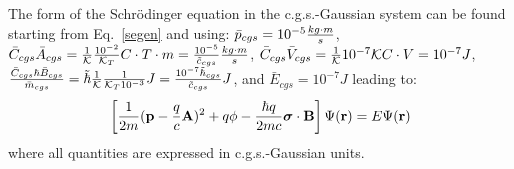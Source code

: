 \documentclass[12pt,a4paper]{article}
\begin{document}
{\color{orange} The form of the Schr\"odinger equation in the c.g.s.-Gaussian
system can be found starting from Eq.~\ref{segen} and using:
$\bar p_{cgs}=10^{-5} {kg\cdot m \over s}$, $\bar C_{cgs} \bar A_{cgs}=
{1\over \mathcal{K}} {10^{-2}\over \mathcal{K}_T} C\cdot T\cdot m = {10^{-5} \over \tilde c_{cgs}}
{kg\cdot m \over s}$, $\bar C_{cgs} \bar V_{cgs}= {1\over \mathcal{K}} 10^{-7} \mathcal{K} 
C\cdot V= 10^{-7} J$, ${\bar C_{cgs} \hbar \bar B_{cgs} \over \bar m_{cgs}}
= \tilde \hbar {1\over \mathcal{K}} {1\over \mathcal{K}_T 10^{-3}} J={10^{-7} \tilde \hbar_{cgs}
\over \tilde c_{cgs}} J$, and $\bar E_{cgs}=10^{-7} J$ leading to:
\begin{equation}
\left[{1\over 2m} ({\bf p}- {q \over c} {\bf A})^2 + 
q \phi - 
{\hbar q \over 2 m c} 
{\boldsymbol \sigma} \cdot {\bf B} \right]
\Psi({\bf r})= E \Psi({\bf r})
\end{equation}
where all quantities are expressed in c.g.s.-Gaussian units.
}

\newpage
\end{document}
